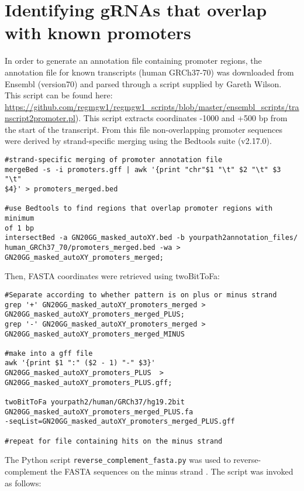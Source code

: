 \section{Identifying gRNAs that overlap with known promoters}

In order to generate an annotation file containing promoter regions,  the annotation file for known transcripts (human GRCh37-70) was downloaded from Ensembl (version70) and parsed through a script supplied by Gareth Wilson. This script can be found here: \url{https://github.com/regmgw1/regmgw1_scripts/blob/master/ensembl_scripts/transcript2promoter.pl}). This script extracts coordinates -1000 and +500 bp from the start of the transcript. From this file non-overlapping promoter sequences were derived by strand-specific merging using the Bedtools suite (v2.17.0).

\begin{lstlisting}
#strand-specific merging of promoter annotation file
mergeBed -s -i promoters.gff | awk '{print "chr"$1 "\t" $2 "\t" $3 "\t"
$4}' > promoters_merged.bed 

#use Bedtools to find regions that overlap promoter regions with minimum 
of 1 bp 
intersectBed -a GN20GG_masked_autoXY.bed -b yourpath2annotation_files/
human_GRCh37_70/promoters_merged.bed -wa >
GN20GG_masked_autoXY_promoters_merged;
\end{lstlisting}

Then, FASTA coordinates were retrieved using twoBitToFa:

\begin{lstlisting}
#Separate according to whether pattern is on plus or minus strand
grep '+' GN20GG_masked_autoXY_promoters_merged >
GN20GG_masked_autoXY_promoters_merged_PLUS; 
grep '-' GN20GG_masked_autoXY_promoters_merged >
GN20GG_masked_autoXY_promoters_merged_MINUS 

#make into a gff file
awk '{print $1 ":" ($2 - 1) "-" $3}' GN20GG_masked_autoXY_promoters_PLUS  >
GN20GG_masked_autoXY_promoters_PLUS.gff;

twoBitToFa yourpath2/human/GRCh37/hg19.2bit
GN20GG_masked_autoXY_promoters_merged_PLUS.fa 
-seqList=GN20GG_masked_autoXY_promoters_merged_PLUS.gff 

#repeat for file containing hits on the minus strand
\end{lstlisting}

The Python script \verb|reverse_complement_fasta.py| was used to reverse-complement the FASTA sequences on the minus strand \cite{Kao:Online}. The script was invoked as follows:

